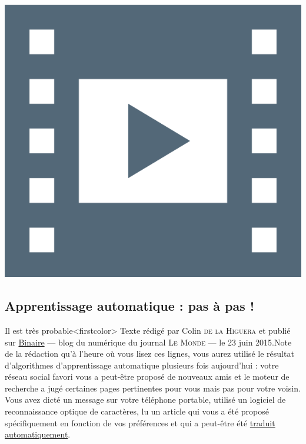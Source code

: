 \begin{marginvideo}
	\vspace{2cm}%
	\href{https://www.youtube.com/watch?v=trWrEWfhTVg}%
	  {\includegraphics[width=\marginparwidth]{./Images/Pictograms/film-strip-dark-electric-blue.png}}%
\end{marginvideo}




\subsection[Apprentissage automatique]{Apprentissage automatique : pas à pas !}
\label{sub:III.4.2}


Il est très probable\caution[t]<firstcolor>{%
\upshape Texte rédigé par Colin \textsc{de la Higuera} et publié sur \href{https://www.lemonde.fr/blog/binaire/2015/06/23/pasapas/}{Binaire} --- blog du numérique du journal \textsc{Le Monde} --- le 23 juin 2015.\parnotes}{\upshape Note de la rédaction}
 qu’à l’heure où vous lisez ces lignes, vous aurez utilisé le résultat d’algorithmes d’apprentissage automatique plusieurs fois aujourd’hui : votre réseau social favori vous a peut-être proposé de nouveaux amis et le moteur de recherche a jugé certaines pages pertinentes pour vous mais pas pour votre voisin. Vous avez dicté un message sur votre téléphone portable, utilisé un logiciel de reconnaissance optique de caractères, lu un article qui vous a été proposé spécifiquement en fonction de vos préférences et qui a peut-être été \href{https://interstices.info/la-traduction-automatique-statistique-comment-ca-marche/}{traduit automatiquement}.

